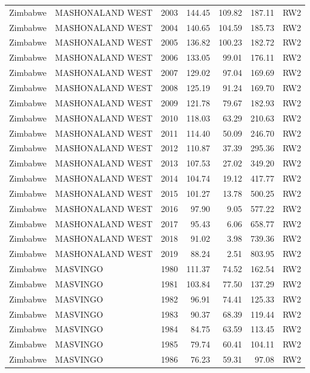 \begin{longtable}{lllrrrl}
  Zimbabwe & MASHONALAND WEST & 2003 & 144.45 & 109.82 & 187.11 & RW2 \\ 
  Zimbabwe & MASHONALAND WEST & 2004 & 140.65 & 104.59 & 185.73 & RW2 \\ 
  Zimbabwe & MASHONALAND WEST & 2005 & 136.82 & 100.23 & 182.72 & RW2 \\ 
  Zimbabwe & MASHONALAND WEST & 2006 & 133.05 & 99.01 & 176.11 & RW2 \\ 
  Zimbabwe & MASHONALAND WEST & 2007 & 129.02 & 97.04 & 169.69 & RW2 \\ 
  Zimbabwe & MASHONALAND WEST & 2008 & 125.19 & 91.24 & 169.70 & RW2 \\ 
  Zimbabwe & MASHONALAND WEST & 2009 & 121.78 & 79.67 & 182.93 & RW2 \\ 
  Zimbabwe & MASHONALAND WEST & 2010 & 118.03 & 63.29 & 210.63 & RW2 \\ 
  Zimbabwe & MASHONALAND WEST & 2011 & 114.40 & 50.09 & 246.70 & RW2 \\ 
  Zimbabwe & MASHONALAND WEST & 2012 & 110.87 & 37.39 & 295.36 & RW2 \\ 
  Zimbabwe & MASHONALAND WEST & 2013 & 107.53 & 27.02 & 349.20 & RW2 \\ 
  Zimbabwe & MASHONALAND WEST & 2014 & 104.74 & 19.12 & 417.77 & RW2 \\ 
  Zimbabwe & MASHONALAND WEST & 2015 & 101.27 & 13.78 & 500.25 & RW2 \\ 
  Zimbabwe & MASHONALAND WEST & 2016 & 97.90 & 9.05 & 577.22 & RW2 \\ 
  Zimbabwe & MASHONALAND WEST & 2017 & 95.43 & 6.06 & 658.77 & RW2 \\ 
  Zimbabwe & MASHONALAND WEST & 2018 & 91.02 & 3.98 & 739.36 & RW2 \\ 
  Zimbabwe & MASHONALAND WEST & 2019 & 88.24 & 2.51 & 803.95 & RW2 \\ 
  Zimbabwe & MASVINGO & 1980 & 111.37 & 74.52 & 162.54 & RW2 \\ 
  Zimbabwe & MASVINGO & 1981 & 103.84 & 77.50 & 137.29 & RW2 \\ 
  Zimbabwe & MASVINGO & 1982 & 96.91 & 74.41 & 125.33 & RW2 \\ 
  Zimbabwe & MASVINGO & 1983 & 90.37 & 68.39 & 119.44 & RW2 \\ 
  Zimbabwe & MASVINGO & 1984 & 84.75 & 63.59 & 113.45 & RW2 \\ 
  Zimbabwe & MASVINGO & 1985 & 79.74 & 60.41 & 104.11 & RW2 \\ 
  Zimbabwe & MASVINGO & 1986 & 76.23 & 59.31 & 97.08 & RW2 \\ 

\end{longtable}
